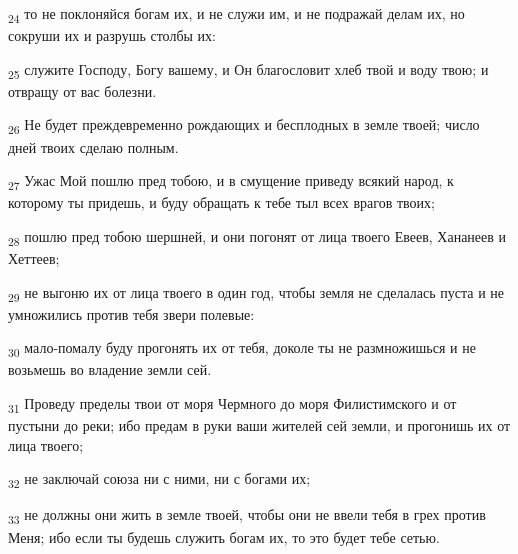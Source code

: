 \begin{tcolorbox}
\textsubscript{24} то не поклоняйся богам их, и не служи им, и не подражай делам их, но сокруши их и разрушь столбы их:
\end{tcolorbox}
\begin{tcolorbox}
\textsubscript{25} служите Господу, Богу вашему, и Он благословит хлеб твой и воду твою; и отвращу от вас болезни.
\end{tcolorbox}
\begin{tcolorbox}
\textsubscript{26} Не будет преждевременно рождающих и бесплодных в земле твоей; число дней твоих сделаю полным.
\end{tcolorbox}
\begin{tcolorbox}
\textsubscript{27} Ужас Мой пошлю пред тобою, и в смущение приведу всякий народ, к которому ты придешь, и буду обращать к тебе тыл всех врагов твоих;
\end{tcolorbox}
\begin{tcolorbox}
\textsubscript{28} пошлю пред тобою шершней, и они погонят от лица твоего Евеев, Хананеев и Хеттеев;
\end{tcolorbox}
\begin{tcolorbox}
\textsubscript{29} не выгоню их от лица твоего в один год, чтобы земля не сделалась пуста и не умножились против тебя звери полевые:
\end{tcolorbox}
\begin{tcolorbox}
\textsubscript{30} мало-помалу буду прогонять их от тебя, доколе ты не размножишься и не возьмешь во владение земли сей.
\end{tcolorbox}
\begin{tcolorbox}
\textsubscript{31} Проведу пределы твои от моря Чермного до моря Филистимского и от пустыни до реки; ибо предам в руки ваши жителей сей земли, и прогонишь их от лица твоего;
\end{tcolorbox}
\begin{tcolorbox}
\textsubscript{32} не заключай союза ни с ними, ни с богами их;
\end{tcolorbox}
\begin{tcolorbox}
\textsubscript{33} не должны они жить в земле твоей, чтобы они не ввели тебя в грех против Меня; ибо если ты будешь служить богам их, то это будет тебе сетью.
\end{tcolorbox}
